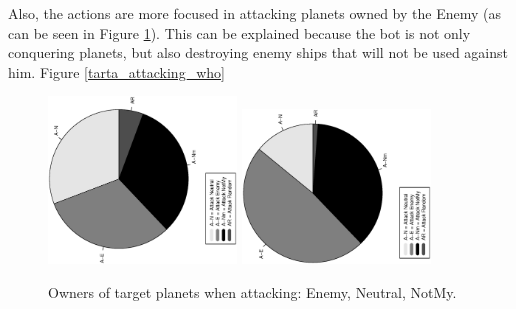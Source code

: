 \documentclass[conference]{IEEEtran}
\begin{document}
Also, the actions are more focused in attacking planets owned by the Enemy (as can be seen in Figure \ref{figura:tarta_attacking_who}). This can be explained because the bot is not only conquering planets, but also destroying enemy ships that will not be used against him.
Figure \ref{tarta_attacking_who}
\begin{figure}[htb]
\tiny
\begin{center}

    \includegraphics[trim=1cm 7cm 1cm 7cm, clip=true,width=5cm,angle=-90]{./imags/distribution_initial_target.eps}
    \includegraphics[trim=1cm 7cm 1cm 7cm, clip=true,width=5cm,angle=-90]{./imags/distribution_final_target.eps}

\end{center}
\caption{Owners of target planets when attacking: Enemy, Neutral,
  NotMy.} %
\label{figura:tarta_attacking_who}
\end{figure}
\end{document}
